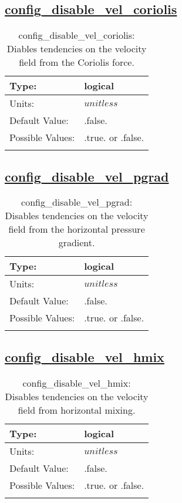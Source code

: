 \subsection[config\_disable\_vel\_coriolis]{\hyperref[sec:nm_tab_debug]{config\_disable\_vel\_coriolis}}
\label{subsec:nm_sec_config_disable_vel_coriolis}
\begin{center}
\begin{longtable}{| p{2.0in} | p{4.0in} |}
    \hline
    Type: & logical \\
    \hline
    Units: & $unitless$ \\
    \hline
    Default Value: & .false. \\
    \hline
    Possible Values: & .true. or .false. \\
    \hline
    \caption{config\_disable\_vel\_coriolis: Diables tendencies on the velocity field from the Coriolis force.}
\end{longtable}
\end{center}
\subsection[config\_disable\_vel\_pgrad]{\hyperref[sec:nm_tab_debug]{config\_disable\_vel\_pgrad}}
\label{subsec:nm_sec_config_disable_vel_pgrad}
\begin{center}
\begin{longtable}{| p{2.0in} | p{4.0in} |}
    \hline
    Type: & logical \\
    \hline
    Units: & $unitless$ \\
    \hline
    Default Value: & .false. \\
    \hline
    Possible Values: & .true. or .false. \\
    \hline
    \caption{config\_disable\_vel\_pgrad: Disables tendencies on the velocity field from the horizontal pressure gradient.}
\end{longtable}
\end{center}
\subsection[config\_disable\_vel\_hmix]{\hyperref[sec:nm_tab_debug]{config\_disable\_vel\_hmix}}
\label{subsec:nm_sec_config_disable_vel_hmix}
\begin{center}
\begin{longtable}{| p{2.0in} | p{4.0in} |}
    \hline
    Type: & logical \\
    \hline
    Units: & $unitless$ \\
    \hline
    Default Value: & .false. \\
    \hline
    Possible Values: & .true. or .false. \\
    \hline
    \caption{config\_disable\_vel\_hmix: Disables tendencies on the velocity field from horizontal mixing.}
\end{longtable}
\end{center}
